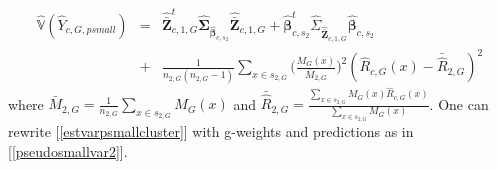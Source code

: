 \documentclass[a4paper,12pt,leqno, titlepage]{article}
\newcommand{\VAR}{\mathbb{V}}
\begin{document}
\begin{eqnarray}\label{estvarpsmallcluster}
\hat{\VAR}(\hat{Y}_{c,G,psmall})&=&
\hat{\bar{\pmb{Z}}}_{c,1,G}^t\hat{\pmb{\Sigma}}_{\hat{\pmb{\beta}}_{c,s_2}}\hat{\bar{\pmb{Z}}}_{c,1,G}
+ \hat{\pmb{\beta}}_{c,s_2}^t\hat{\Sigma}_{\hat{\bar{\pmb{Z}}}_{c,1,G}}\hat{\pmb{\beta}}_{c,s_2}
\nonumber \\ &+& \frac{1}{n_{2,G}(n_{2,G}-1)}\sum_{x\in{s_{2,G}}}\big(\frac{M_G(x)}{\bar{M}_{2,G}}\big)^2
(\hat{R}_{c,G}(x)-\bar{\hat{R}}_{2,G})^2
\end{eqnarray}
where $\bar{M}_{2,G}=\frac{1}{n_{2,G}}\sum_{x\in{s_{2,G}}}M_G(x)$ and
$\bar{\hat{R}}_{2,G}=\frac{\sum_{x\in{s_{2,G}}}M_G(x)\hat{R}_{c,G}(x)}{\sum_{x\in{s_{2,G}}}M_G(x)}$.
One can rewrite [\ref{estvarpsmallcluster}] with g-weights and predictions as in [\ref{pseudosmallvar2}].
\par
\end{document}
